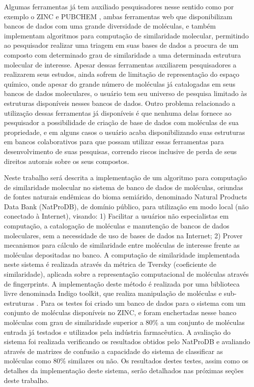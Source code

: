 Algumas ferramentas já tem auxiliado pesquisadores nesse sentido como por exemplo o ZINC \cite{irwin2005zinc} e PUBCHEM \cite{li2010pubchem}, ambas ferramentas web que disponibilizam bancos de dados com uma grande diversidade de moléculas, e também implementam algoritmos para computação de similaridade molecular, permitindo ao pesquisador realizar uma triagem em suas bases de dados a procura de um composto com determinado grau de similaridade a uma determinada estrutura molecular de interesse. Apesar dessas ferramentas auxiliarem pesquisadores a realizarem seus estudos, ainda sofrem de limitação de representação do espaço químico, onde apesar do grande número de moléculas já catalogadas em seus bancos de dados moleculares, o usuário tem seu universo de pesquisa limitado às estruturas disponíveis nesses bancos de dados. Outro problema relacionado a utilização dessas ferramentas já disponíveis é que nenhuma delas fornece ao pesquisador a possibilidade de criação de base de dados com moléculas de sua propriedade, e em alguns casos o usuário acaba disponibilizando suas estruturas em bancos colaborativos para que possam utilizar essas ferramentas para desenvolvimento de suas pesquisas, correndo riscos inclusive de perda de seus direitos autorais sobre os  seus compostos.

Neste trabalho será descrita a implementação de um algoritmo para computação de similaridade molecular no sistema de banco de dados de moléculas, oriundas de fontes naturais endêmicas do bioma semiárido, denominado Natural Products Data Bank (NatProDB), de domínio público, para utilização em modo local (não conectado à Internet), visando: 1) Facilitar a usuários não especialistas em computação, a catalogação de moléculas e manutenção de bancos de dados moleculares, sem a necessidade de uso de bases de dados na Internet; 2) Prover mecanismos para cálculo de similaridade entre moléculas de interesse frente as moléculas depositadas no banco. A computação de similaridade implementada neste sistema é realizada através da métrica de Tversky (coeficiente de similaridade), aplicada sobre a representação computacional de moléculas através de fingerprints. A implementação deste método é realizada por uma biblioteca livre denominada Indigo toolkit, que realiza manipulação de moléculas e sub-estruturas \cite{pavlov2011indigo}. Para os testes foi criado um banco de dados para o sistema com um conjunto de moléculas disponíveis no ZINC, e foram enchertadas nesse banco moléculas com grau de similaridade superior a 80\% a um conjunto de moléculas entrada já testados e utilizados pela indústria farmacêutica. A avaliação do sistema foi realizada verificando os resultados obtidos pelo NatProDB e avaliando através de matrizes de confusão a capacidade do sistema de classificar as moléculas como 80\% similares ou não. Os resultados destes testes, assim como os detalhes da implementação deste sistema, serão detalhados nas próximas seções deste trabalho.



